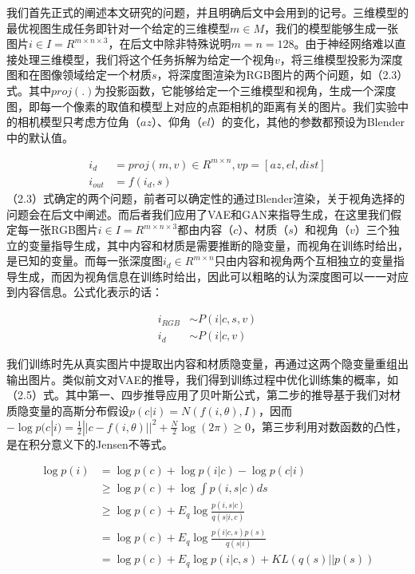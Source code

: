 \documentclass[UTF8,openany,AutoFakeBold,AutoFakeSlant,cs4size]{ctexbook}
\begin{document}
我们首先正式的阐述本文研究的问题，并且明确后文中会用到的记号。三维模型的最优视图生成任务即针对一个给定的三维模型$m \in M$，我们的模型能够生成一张图片$i \in I = R^{m \times n \times 3}$，在后文中除非特殊说明$m = n = 128$。由于神经网络难以直接处理三维模型，我们将这个任务拆解为给定一个视角$v$，将三维模型投影为深度图和在图像领域给定一个材质$s$，将深度图渲染为RGB图片的两个问题，如（2.3）式。其中$proj(.)$为投影函数，它能够给定一个三维模型和视角，生成一个深度图，即每一个像素的取值和模型上对应的点距相机的距离有关的图片。我们实验中的相机模型只考虑方位角（$az$）、仰角（$el$）的变化，其他的参数都预设为Blender中的默认值。

\begin{equation}
	\begin{aligned}
		i_{d} &= proj(m, v) \in R^{m \times n}, vp = [az, el, dist] \\
		i_{out} &= f(i_{d}, s)
	\end{aligned}
\end{equation}
（2.3）式确定的两个问题，前者可以确定性的通过Blender渲染，关于视角选择的问题会在后文中阐述。而后者我们应用了VAE和GAN来指导生成，在这里我们假定每一张RGB图片$i \in I = R^{m \times n \times 3}$都由内容（$c$）、材质（$s$）和视角（$v$）三个独立的变量指导生成，其中内容和材质是需要推断的隐变量，而视角在训练时给出，是已知的变量。而每一张深度图$i_{d} \in R^{m \times n}$只由内容和视角两个互相独立的变量指导生成，而因为视角信息在训练时给出，因此可以粗略的认为深度图可以一一对应到内容信息。公式化表示的话：

\begin{equation}
	\begin{aligned}
		i_{RGB} &\sim P(i | c, s, v) \\ i_{d} &\sim P(i | c, v)
	\end{aligned}
\end{equation}

我们训练时先从真实图片中提取出内容和材质隐变量，再通过这两个隐变量重组出输出图片。类似前文对VAE的推导，我们得到训练过程中优化训练集的概率，如（2.5）式。其中第一、四步推导应用了贝叶斯公式，第二步的推导基于我们对材质隐变量的高斯分布假设$p(c | i) = N(f(i, \theta), I)$，因而$-\log p(c | i) = \frac{1}{2}||c - f(i, \theta) ||^2 + \frac{N}{2}\log (2\pi) \geq 0$，第三步利用对数函数的凸性，是在积分意义下的Jensen不等式。

\begin{equation}
	\begin{aligned}
		\log p(i) &= \log p(c) + \log p(i | c) - \log p(c | i) \\
		&\geq \log p(c) + \log  \int p(i, s | c) ds \\
		&\geq \log p(c) + E_{q} \log \frac{p(i, s | c)}{q(s | i, c)} \\
		&= \log p(c) + E_{q} \log \frac{p(i | c, s)p(s)}{q(s | i)} \\
		&= \log p(c) + E_{q} \log p(i | c, s) + KL(q(s) || p(s)) \\
	\end{aligned}
\end{equation}
\end{document}
